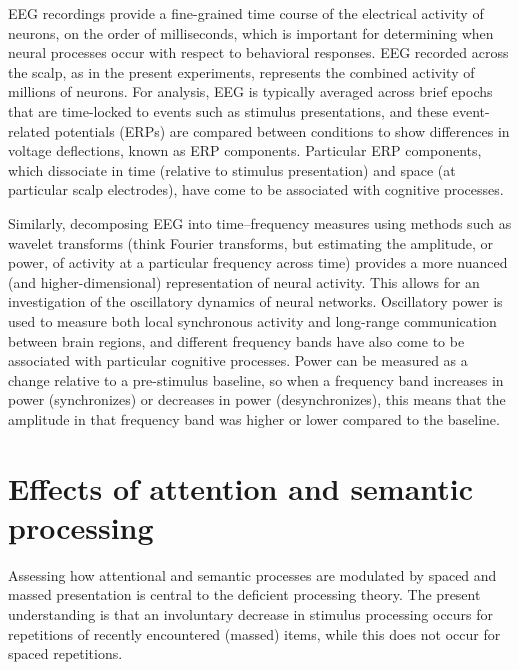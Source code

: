 EEG recordings provide a fine-grained time course of the electrical
activity of neurons, on the order of milliseconds, which is important
for determining when neural processes occur with respect to behavioral
responses.  EEG recorded across the scalp, as in the present experiments, represents the combined activity of millions of neurons.  For analysis, EEG is typically averaged across brief
epochs that are time-locked to events such as stimulus presentations,
and these event-related potentials (ERPs) are compared between
conditions to show differences in voltage deflections, known as ERP
components.  Particular ERP components, which dissociate in time
(relative to stimulus presentation) and space (at particular scalp
electrodes), have come to be associated with cognitive processes.

Similarly, decomposing EEG into time--frequency measures using methods such as wavelet transforms
(think Fourier transforms, but estimating the amplitude, or power, of
activity at a particular frequency across time) provides a more
nuanced (and higher-dimensional) representation of neural activity.
This allows for an investigation of the oscillatory dynamics of neural
networks.  Oscillatory power is used to measure both local synchronous
activity and long-range communication between brain regions, and
different frequency bands have also come to be associated with particular
cognitive processes.  Power can be measured as a change relative to a pre-stimulus baseline, so when a frequency band increases in power (synchronizes) or decreases in power (desynchronizes), this means that the amplitude in that frequency band was higher or lower compared to the baseline.

\cbend



\section{Effects of attention and semantic processing}


Assessing how attentional and semantic processes are modulated by spaced and massed presentation is central to the deficient processing theory.
The present understanding is that an involuntary decrease in stimulus processing occurs for repetitions of recently encountered (massed) items, while this does not occur for spaced repetitions.

